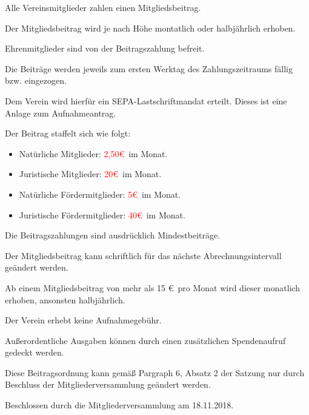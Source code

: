 \documentclass[parskip=half]{scrreprt}
\newcommand{\TODO}[1]{\textcolor{red}{#1}}
\begin{document}
 
  
\addchap{Beitragsordnung des \TODO{Hackspace Marburg e.V.} }

\begin{contract} 

\Clause{} 
Alle Vereinsmitglieder zahlen einen Mitgliedsbeitrag.

Der Mitgliedsbeitrag wird je nach Höhe montatlich oder halbjährlich erhoben.

Ehrenmitglieder sind von der Beitragszahlung befreit.


\Clause{}
Die Beitr\"age werden jeweils zum ersten Werktag des Zahlungszeitraums f\"allig bzw. eingezogen.

Dem Verein wird hierf\"ur ein SEPA-Lastschriftmandat erteilt.
Dieses ist eine Anlage zum Aufnahmeantrag.
  
\Clause{} 
Der Beitrag staffelt sich wie folgt:
\begin{itemize}
\item Natürliche Mitglieder: \TODO{2,50\euro}\ im Monat.
\item Juristische Mitglieder: \TODO{20\euro}\ im Monat.
\item Natürliche Fördermitglieder: \TODO{5\euro}\ im Monat.
\item Juristische Fördermitglieder: \TODO{40\euro}\ im Monat.
\end{itemize}

Die Beitragszahlungen sind ausdr\"ucklich Mindestbeitr\"age.

Der Mitgliedsbeitrag kann schriftlich für das nächste Abrechnungsintervall geändert werden.

Ab einem Mitgliedsbeitrag von mehr als 15 \euro\ pro Monat wird dieser monatlich erhoben, ansonsten halbjährlich.


\Clause{}
Der Verein erhebt keine Aufnahmegeb\"uhr.

\Clause{}
Au{\ss}erordentliche Ausgaben k\"onnen durch einen zus\"atzlichen Spendenaufruf gedeckt werden.

\Clause{}
Diese Beitragsordnung kann gemäß Pargraph 6, Absatz 2 der Satzung nur durch Beschluss der Mitgliederversammlung geändert werden.


\end{contract} 
  
  
 \vspace{3cm}
  
Beschlossen durch die Mitgliederversammlung am 18.11.2018.
\end{document}
